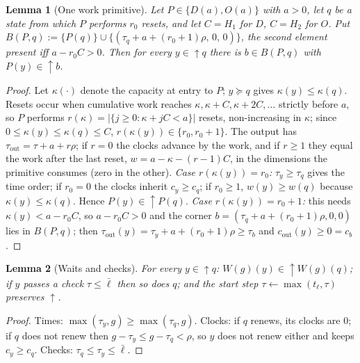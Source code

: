 \documentclass[11pt]{article}
\newtheorem{lemma}{Lemma}
\begin{document}
\begin{lemma}[One work primitive]
\label{lem:primitive}
Let $P \in \{D(a), O(a)\}$ with $a > 0$, let $q$ be a state from which
$P$ performs $r_0$ resets, and let $C = H_1$ for $D$, $C = H_2$ for
$O$. Put $B(P, q) := \{P(q)\} \cup \{(\tau_q + a + (r_0 + 1)\rho,\, 0,\, 0)\}$,
the second element present iff $a - r_0 C > 0$. Then for every
$y \in \uparrow\! q$ there is $b \in B(P, q)$ with $P(y) \in \uparrow\! b$.
\end{lemma}

\begin{proof}
Let $\kappa(\cdot)$ denote the capacity at entry to $P$; $y \succeq q$
gives $\kappa(y) \leq \kappa(q)$. Resets occur when cumulative work
reaches $\kappa, \kappa + C, \kappa + 2C, \dots$ strictly before $a$,
so $P$ performs $r(\kappa) = |\{j \geq 0 : \kappa + jC < a\}|$ resets,
non-increasing in $\kappa$; since $0 \leq \kappa(y) \leq \kappa(q) \leq C$,
$r(\kappa(y)) \in \{r_0, r_0 + 1\}$. The output has
$\tau_{\mathrm{out}} = \tau + a + r\rho$; if $r = 0$ the clocks advance
by the work, and if $r \geq 1$ they equal the work after the last
reset, $w = a - \kappa - (r - 1)C$, in the dimensions the primitive
consumes (zero in the other). \emph{Case $r(\kappa(y)) = r_0$:}
$\tau_y \geq \tau_q$ gives the time order; if $r_0 = 0$ the clocks
inherit $c_y \geq c_q$; if $r_0 \geq 1$, $w(y) \geq w(q)$ because
$\kappa(y) \leq \kappa(q)$. Hence $P(y) \in \uparrow\! P(q)$.
\emph{Case $r(\kappa(y)) = r_0 + 1$:} this needs
$\kappa(y) < a - r_0 C$, so $a - r_0 C > 0$ and the corner
$b = (\tau_q + a + (r_0 + 1)\rho, 0, 0)$ lies in $B(P, q)$; then
$\tau_{\mathrm{out}}(y) = \tau_y + a + (r_0 + 1)\rho \geq \tau_b$ and
$c_{\mathrm{out}}(y) \geq 0 = c_b$.
\end{proof}

\begin{lemma}[Waits and checks]
\label{lem:wait}
For every $y \in \uparrow\! q$: $W(g)(y) \in \uparrow\! W(g)(q)$; if $y$
passes a check $\tau \leq \bar{\ell}$ then so does $q$; and the start
step $\tau \leftarrow \max(t_\ell, \tau)$ preserves $\uparrow$.
\end{lemma}

\begin{proof}
Times: $\max(\tau_y, g) \geq \max(\tau_q, g)$. Clocks: if $q$ renews,
its clocks are $0$; if $q$ does not renew then
$g - \tau_y \leq g - \tau_q < \rho$, so $y$ does not renew either and
keeps $c_y \geq c_q$. Checks: $\tau_q \leq \tau_y \leq \bar{\ell}$.
\end{proof}
\end{document}
